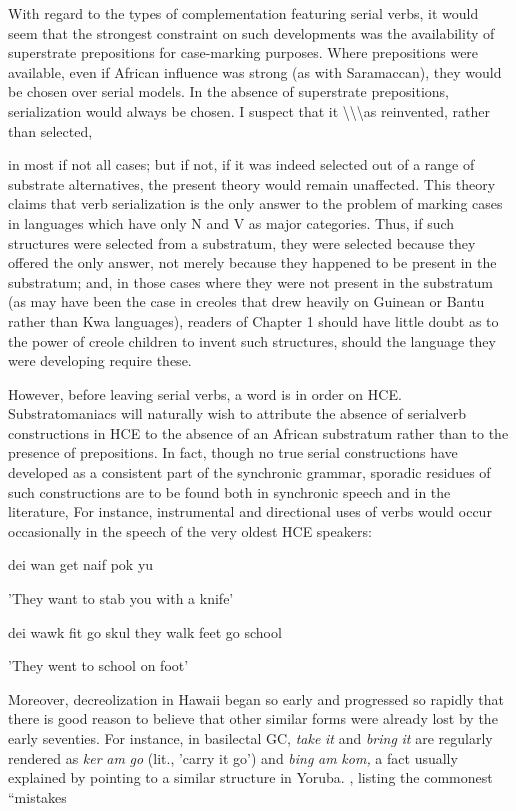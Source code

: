 With regard to the types of complementation featuring serial verbs, it would seem that the strongest constraint on such develop\-ments was the availability of superstrate prepositions for case-marking purposes. Where prepositions were available, even if African influence was strong (as with Saramaccan), they would be chosen over serial models. In the absence of superstrate prepositions, serialization would always be chosen. I suspect that it {\textbackslash}{\textbackslash}{\textbackslash}as reinvented, rather than selected,


in most if not all cases; but if not, if it was indeed selected out of a range of substrate alternatives, the present theory would remain un\-affected. This theory claims that verb serialization is the only answer to the problem of marking cases in languages which have only N and V as major categories. Thus, if such structures were selected from a substratum, they were selected because they offered the only answer, not merely because they happened to be present in the substratum; and, in those cases where they were not present in the substratum (as may have been the case in creoles that drew heavily on Guinean or Bantu rather than Kwa languages), readers of Chapter 1 should have little doubt as to the power of creole children to invent such structures, should the language they were developing require these.

However, before leaving serial verbs, a word is in order on HCE. Substratomaniacs will naturally wish to attribute the absence of serial\-verb constructions in HCE to the absence of an African substratum rather than to the presence of prepositions. In fact, though no true serial constructions have developed as a consistent part of the syn\-chronic grammar, sporadic residues of such constructions are to be found both in synchronic speech and in the literature, For instance, instrumental and directional uses of verbs would occur occasionally in the speech of the very oldest HCE speakers:

\ea\label{ex:263}
 dei wan get naif pok yu
\glt
\z

'They want to stab you with a knife'

\ea\label{ex:264}
 dei wawk fit go skul they walk feet go school
\glt
\z

'They went to school on foot'

Moreover, decreolization in Hawaii began so early and progressed so rapidly that there is good reason to believe that other similar forms were already lost by the early seventies. For instance, in basilectal GC, \textit{take} \textit{it} and \textit{bring} \textit{it} are regularly rendered as \textit{ker} \textit{am} \textit{go }(lit., 'carry it go') and \textit{bi}\textit{n}\textit{g} \textit{am} \textit{k}\textit{om,} a fact usually explained by pointing to a similar structure in Yoruba. \citet{Smith1939}, listing the commonest ``mistakes{\textquotedbl}

